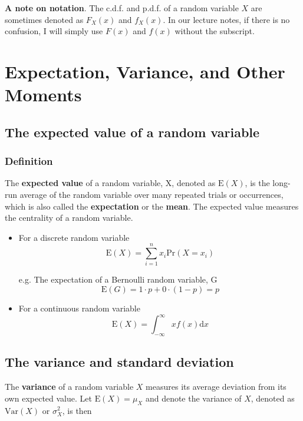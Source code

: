\documentclass[a4paper,11pt]{article}
\begin{document}
\textbf{A note on notation}. The c.d.f. and p.d.f. of a random variable \(X\) are
sometimes denoted as \(F_X(x)\) and \(f_X(x)\). In our lecture notes, if
there is no confusion, I will simply use \(F(x)\) and \(f(x)\) without the
subscript. 


\section{Expectation, Variance, and Other Moments}
\label{sec:orgb012a8d}

\subsection{The expected value of a random variable}
\label{sec:orgf003115}

\subsubsection*{Definition}
\label{sec:org2ae29e2}

The \textbf{expected value} of a random variable, X, denoted as \(\mathrm{E}(X)\), is
the long-run average of the random variable over many repeated
trials or occurrences, which is also called the \textbf{expectation} or the
\textbf{mean}. The expected value measures the centrality of a random
variable.

\begin{itemize}
\item For a discrete random variable
\[ \mathrm{E}(X) = \sum_{i=1}^n x_i \mathrm{Pr}(X = x_i) \]

e.g. The expectation of a Bernoulli random variable, G
  \[ \mathrm{E}(G) = 1 \cdot p + 0 \cdot (1-p) = p \]

\item For a continuous random variable
\[ \mathrm{E}(X) = \int_{-\infty}^{\infty} x f(x) \mathrm{d}x\]
\end{itemize}

\subsection{The variance and standard deviation}
\label{sec:orgd3ffb09}

The \textbf{variance} of a random variable \(X\) measures its average
deviation from its own expected value. Let \(\mathrm{E}(X) = \mu_X\) and denote
the variance of \(X\), denoted as \(\mathrm{Var}(X)\) or \(\sigma^2_X\), is then
\end{document}
